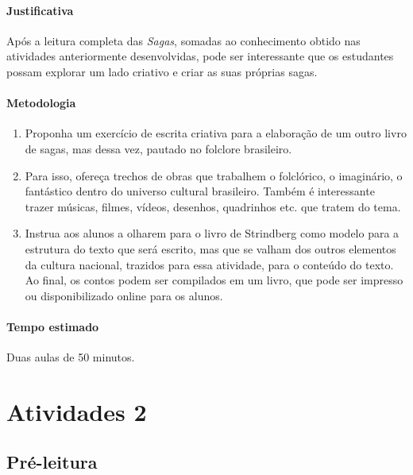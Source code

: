 \documentclass[12pt]{extarticle}
\begin{document}
\paragraph{Justificativa} Após a leitura completa das \emph{Sagas}, somadas ao
conhecimento obtido nas atividades anteriormente desenvolvidas, pode ser interessante 
que os estudantes possam explorar um lado criativo e criar as suas próprias sagas.

\paragraph{Metodologia}

\begin{enumerate}

\item Proponha
um exercício de escrita criativa para a elaboração de um outro livro de
sagas, mas dessa vez, pautado no folclore brasileiro.

\item Para isso, ofereça
trechos de obras que trabalhem o folclórico, o imaginário, o fantástico
dentro do universo cultural brasileiro. Também é interessante trazer
músicas, filmes, vídeos, desenhos, quadrinhos etc. que tratem do tema.

\item Instrua aos alunos a olharem para o livro de Strindberg como modelo para
a estrutura do texto que será escrito, mas que se valham dos outros
elementos da cultura nacional, trazidos para essa atividade, para o
conteúdo do texto. Ao final, os contos podem ser compilados em um livro,
que pode ser impresso ou disponibilizado online para os alunos.

\end{enumerate}

\paragraph{Tempo estimado} Duas aulas de 50 minutos.



\section{Atividades 2}

\subsection{Pré-leitura}
\end{document}
